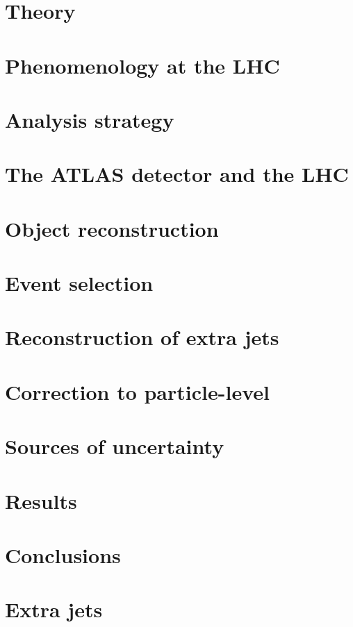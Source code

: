 \documentclass[12pt]{ucbthesis}
\begin{document}
\chapter{Theory}
\label{ch:theory}

\chapter{Phenomenology at the LHC}
\label{ch:pheno}

\chapter{Analysis strategy}
\label{ch:strategy}

\chapter{The ATLAS detector and the LHC}
\label{ch:atlas}

\chapter{Object reconstruction}
\label{ch:objects}

\chapter{Event selection}
\label{ch:event}

\chapter{Reconstruction of extra jets}
\label{ch:extrajets}

\chapter{Correction to particle-level}
\label{ch:unfolding}

\chapter{Sources of uncertainty}
\label{ch:syst}

\chapter{Results}
\label{ch:results}

\chapter{Conclusions}
\label{ch:conclusions}

\appendix
\chapter{Extra jets}
\end{document}
